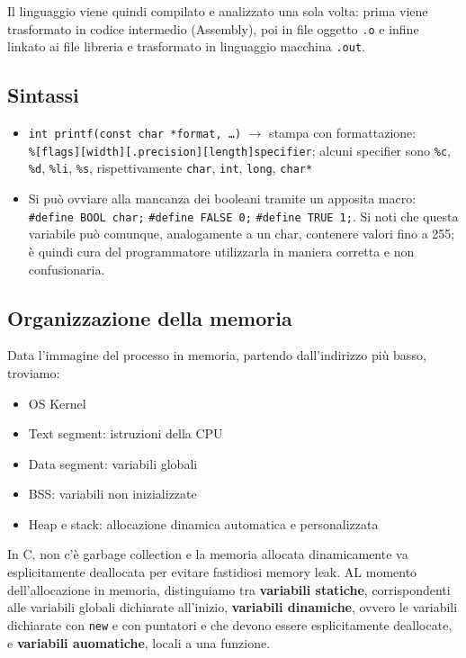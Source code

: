 \documentclass[11pt]{article}
\begin{document}
Il linguaggio viene quindi compilato e analizzato una sola volta: prima viene trasformato in codice intermedio (Assembly), poi in file oggetto \verb|.o| e infine linkato ai file libreria e trasformato in linguaggio macchina \verb|.out|.

\subsection{Sintassi}

\begin{itemize}
    \item\verb|int printf(const char *format, …)| $\rightarrow$ stampa con formattazione:\\ \verb|%[flags][width][.precision][length]specifier|; alcuni specifier sono \verb|%c|, \verb|%d|, \verb|%li|, \verb|%s|, rispettivamente \verb|char|, \verb|int|, \verb|long|, \verb|char*|
    \item Si può ovviare alla mancanza dei booleani tramite un apposita macro: \verb|#define BOOL char;| \verb|#define FALSE 0;| \verb|#define TRUE 1;|. Si noti che questa variabile può comunque, analogamente a un char, contenere valori fino a 255; è quindi cura del programmatore utilizzarla in maniera corretta e non confusionaria.
\end{itemize}

\subsection{Organizzazione della memoria}

Data l'immagine del processo in memoria, partendo dall'indirizzo più basso, troviamo:
\begin{itemize}
    \item OS Kernel
    \item Text segment: istruzioni della CPU
    \item Data segment: variabili globali
    \item BSS: variabili non inizializzate
    \item Heap e stack: allocazione dinamica automatica e personalizzata
\end{itemize}

In C, non c'è garbage collection e la memoria allocata dinamicamente va esplicitamente deallocata per evitare fastidiosi memory leak. AL momento dell'allocazione in memoria, distinguiamo tra \textbf{variabili statiche}, corrispondenti alle variabili globali dichiarate all'inizio, \textbf{variabili dinamiche}, ovvero le variabili dichiarate con \verb|new| e con puntatori e che devono essere esplicitamente deallocate, e \textbf{variabili auomatiche}, locali a una funzione.
\end{document}
